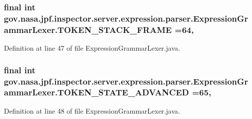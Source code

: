 \subsubsection[{\texorpdfstring{T\+O\+K\+E\+N\+\_\+\+S\+T\+A\+C\+K\+\_\+\+F\+R\+A\+ME}{TOKEN_STACK_FRAME}}]{\setlength{\rightskip}{0pt plus 5cm}final int gov.\+nasa.\+jpf.\+inspector.\+server.\+expression.\+parser.\+Expression\+Grammar\+Lexer.\+T\+O\+K\+E\+N\+\_\+\+S\+T\+A\+C\+K\+\_\+\+F\+R\+A\+ME =64\hspace{0.3cm}{\ttfamily [static]}, {\ttfamily [package]}}\hypertarget{classgov_1_1nasa_1_1jpf_1_1inspector_1_1server_1_1expression_1_1parser_1_1_expression_grammar_lexer_a89cd27213ca37573a0d9dde50646a24c}{}\label{classgov_1_1nasa_1_1jpf_1_1inspector_1_1server_1_1expression_1_1parser_1_1_expression_grammar_lexer_a89cd27213ca37573a0d9dde50646a24c}


Definition at line 47 of file Expression\+Grammar\+Lexer.\+java.

\subsubsection[{\texorpdfstring{T\+O\+K\+E\+N\+\_\+\+S\+T\+A\+T\+E\+\_\+\+A\+D\+V\+A\+N\+C\+ED}{TOKEN_STATE_ADVANCED}}]{\setlength{\rightskip}{0pt plus 5cm}final int gov.\+nasa.\+jpf.\+inspector.\+server.\+expression.\+parser.\+Expression\+Grammar\+Lexer.\+T\+O\+K\+E\+N\+\_\+\+S\+T\+A\+T\+E\+\_\+\+A\+D\+V\+A\+N\+C\+ED =65\hspace{0.3cm}{\ttfamily [static]}, {\ttfamily [package]}}\hypertarget{classgov_1_1nasa_1_1jpf_1_1inspector_1_1server_1_1expression_1_1parser_1_1_expression_grammar_lexer_a29860919f354e3a04dd49cfc2d893c48}{}\label{classgov_1_1nasa_1_1jpf_1_1inspector_1_1server_1_1expression_1_1parser_1_1_expression_grammar_lexer_a29860919f354e3a04dd49cfc2d893c48}


Definition at line 48 of file Expression\+Grammar\+Lexer.\+java.


